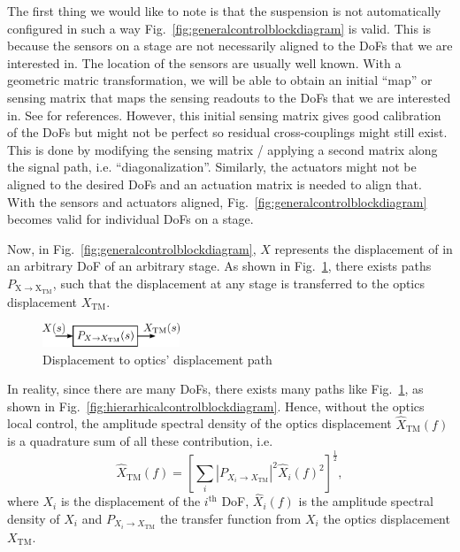 The first thing we would like to note is that the suspension is not automatically configured in such a way Fig.~\ref{fig:generalcontrolblockdiagram} is valid.
This is because the sensors on a stage are not necessarily aligned to the DoFs that we are interested in.
The location of the sensors are usually well known.
With a geometric matric transformation, we will be able to obtain an initial ``map'' or sensing matrix that maps the sensing readouts to the DoFs that we are interested in.
See \cite{bs_suspension_diagonalization, sr_suspension_diagonalization, all_of_the_vibration,  sensing_matrices_oplev} for references.
However, this initial sensing matrix gives good calibration of the DoFs but might not be perfect so residual cross-couplings might still exist.
This is done by modifying the sensing matrix / applying a second matrix along the signal path, i.e. ``diagonalization''.
Similarly, the actuators might not be aligned to the desired DoFs and an actuation matrix is needed to align that.
With the sensors and actuators aligned, Fig.~\ref{fig:generalcontrolblockdiagram} becomes valid for individual DoFs on a stage.

Now, in Fig.~\ref{fig:generalcontrolblockdiagram}, $X$ represents the displacement of in an arbitrary DoF of an arbitrary stage.
As shown in Fig.~\ref{fig:displacementtooptics}, there exists paths $P_\mathrm{X\to X_\mathrm{TM}}$, such that the displacement at any stage is transferred to the optics displacement $X_\mathrm{TM}$.
\begin{figure}[!h]
	\centering
	\includegraphics[width=41mm]{figures/displacement_to_optics}
	\caption{Displacement to optics' displacement path}
	\label{fig:displacementtooptics}
\end{figure}
In reality, since there are many DoFs, there exists many paths like Fig.~\ref{fig:displacementtooptics}, as shown in Fig.~\ref{fig:hierarhicalcontrolblockdiagram}.
Hence, without the optics local control, the amplitude spectral density of the optics displacement $\hat{X}_\mathrm{TM}(f)$ is a quadrature sum of all these contribution, i.e.
\begin{equation}
	\hat{X}_\mathrm{TM}(f)=\left[\sum_i\left\lvert P_{X_i\to X_\mathrm{TM}}\right\rvert^2 \hat{X}_i(f)^2\right]^{\frac{1}{2}},
	\label{eqn:x_tm_asd}
\end{equation}
where $X_i$ is the displacement of the $i^\mathrm{th}$ DoF, $\hat{X}_i(f)$ is the amplitude spectral density of $X_i$ and $P_{X_i\to X_\mathrm{TM}}$ the transfer function from $X_i$ the optics displacement $X_\mathrm{TM}$.

